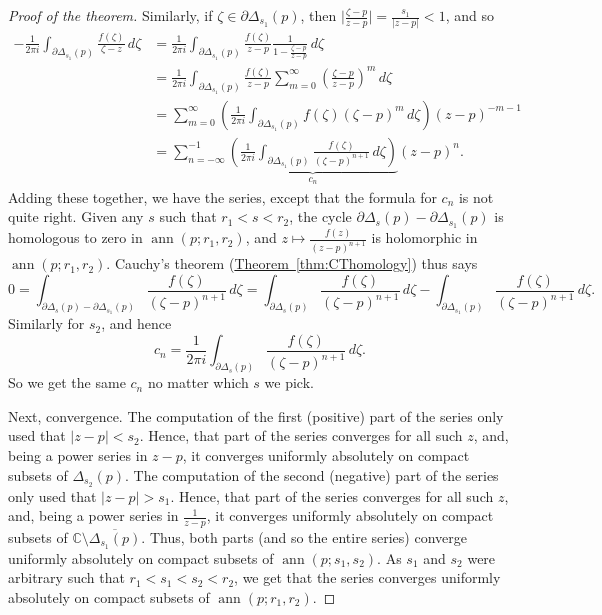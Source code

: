 \documentclass[12pt,openany]{book}
\newcommand{\ann}{\operatorname{ann}}
\newcommand{\sabs}[1]{\lvert {#1} \rvert}
\newcommand{\babs}[1]{\bigl\lvert {#1} \bigr\rvert}
\newcommand{\C}{{\mathbb{C}}}
\theoremstyle{plain}
\theoremstyle{remark}
\theoremstyle{definition}
\theoremstyle{exercise}
\theoremstyle{example}
\newcommand{\thmref}[1]{\hyperref[#1]{Theorem~\ref*{#1}}}
\begin{document}
\begin{proof}[Proof of the theorem]
Similarly, 
if $\zeta \in \partial \Delta_{s_1}(p)$, then
$\babs{\frac{\zeta-p}{z-p}} = \frac{s_1}{\sabs{z-p}} < 1$, and so
\begin{equation*}
\begin{split}
-\frac{1}{2\pi i}
\int_{\partial \Delta_{s_1}(p)} \frac{f(\zeta)}{\zeta-z} \, d\zeta 
& = 
\frac{1}{2\pi i}
\int_{\partial \Delta_{s_1}(p)} \frac{f(\zeta)}{z-p}
\frac{1}{1-\frac{\zeta-p}{z-p}} \, d\zeta
\\
& =
\frac{1}{2\pi i}
\int_{\partial \Delta_{s_1}(p)} \frac{f(\zeta)}{z-p}
\sum_{m=0}^\infty
{\left(\frac{\zeta-p}{z-p}\right)}^m \, d\zeta
\\
& =
\sum_{m=0}^\infty
\left(
\frac{1}{2\pi i}
\int_{\partial \Delta_{s_1}(p)} f(\zeta){(\zeta-p)}^{m}
 \, d\zeta
\right)
{(z-p)}^{-m-1}
\\
& =
\sum_{n=-\infty}^{-1}
\underbrace{
\left(
\frac{1}{2\pi i}
\int_{\partial \Delta_{s_1}(p)} \frac{f(\zeta)}{{(\zeta-p)}^{n+1}}
 \, d\zeta
\right)
}_{c_n}
{(z-p)}^{n} .
\end{split}
\end{equation*}
Adding these together, we have the series, except that the formula for $c_n$
is not quite right.  Given any $s$ such that
$r_1 < s < r_2$,
the cycle
$\partial \Delta_{s}(p) - \partial \Delta_{s_1}(p)$ is homologous to zero in
$\ann(p;r_1,r_2)$, and 
$z \mapsto \frac{f(z)}{{(z-p)}^{n+1}}$ is holomorphic in 
$\ann(p;r_1,r_2)$.  Cauchy's theorem (\thmref{thm:CThomology}) thus says
\begin{equation*}
0 = \int_{\partial \Delta_{s}(p) - \partial \Delta_{s_1}(p)}
\frac{f(\zeta)}{{(\zeta-p)}^{n+1}} \, d\zeta
=
\int_{\partial \Delta_{s}(p)}
\frac{f(\zeta)}{{(\zeta-p)}^{n+1}} \, d\zeta
-
\int_{\partial \Delta_{s_1}(p)}
\frac{f(\zeta)}{{(\zeta-p)}^{n+1}} \, d\zeta .
\end{equation*}
Similarly for $s_2$, and hence
\begin{equation*}
c_n = \frac{1}{2\pi i}
\int_{\partial \Delta_{s}(p)} \frac{f(\zeta)}{{(\zeta-p)}^{n+1}}
 \, d\zeta .
\end{equation*}
So we get the same $c_n$ no matter which $s$ we pick.

Next, convergence.
The computation of the first (positive) part of the series
only used that $\sabs{z-p} < s_2$.
Hence, that part of the series converges
for all such $z$,
and, being a power series in $z-p$,
it converges uniformly absolutely on compact subsets of
$\Delta_{s_2}(p)$.
The computation of the second (negative) part of the series
only used that $\sabs{z-p} > s_1$.
Hence, that part of the series converges
for all such $z$,
and, being a power series in $\frac{1}{z-p}$,
it converges uniformly absolutely on compact subsets of
$\C \setminus \overline{\Delta_{s_1}(p)}$.
Thus, both parts (and so the entire series) 
converge uniformly absolutely on compact
subsets of $\ann(p;s_1,s_2)$.  As $s_1$ and $s_2$ were arbitrary such that
$r_1 < s_1 < s_2 < r_2$, we get that the series
converges uniformly absolutely on compact subsets of $\ann(p;r_1,r_2)$.


\end{proof}
\end{document}
